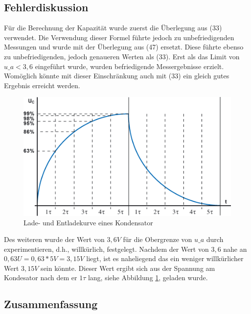 \subsection{Fehlerdiskussion}
\label{subsec:a4-fehlerdiskussion}

Für die Berechnung der Kapazität wurde zuerst die Überlegung aus (33) verwendet.
Die Verwendung dieser Formel führte jedoch zu unbefriedigenden Messungen und wurde mit der Überlegung aus (47) ersetzt.
Diese führte ebenso zu unbefriedigenden, jedoch genaueren Werten als (33).
Erst als das Limit von $u\_a < 3,6$ eingeführt wurde, wurden befriedigende Messergebnisse erzielt.
Womöglich könnte mit dieser Einschränkung auch mit (33) ein gleich gutes Ergebnis erreicht werden.

\begin{figure}[ht]
    \centering
    \includegraphics[width=\textwidth]{pictures/Kondensator-Ladekurve.png}
    \caption{Lade- und Entladekurve eines Kondensator \cite{kondesator}}
    \label{fig:lade-entladekurve-kondensator}
\end{figure}

Des weiteren wurde der Wert von $3,6V$ für die Obergrenze von $u\_a$ durch experimentieren, d.h., willkürlich, festgelegt.
Nachdem der Wert von $3,6$ nahe an $0,63U = 0,63*5V = 3,15V$ liegt, ist es naheliegend das ein weniger willkürlicher Wert $3,15V$ sein könnte.
Dieser Wert ergibt sich aus der Spannung am Kondesator nach dem er $1\tau$ lang, siehe Abbildung \ref{fig:lade-entladekurve-kondensator}, geladen wurde.

\subsection{Zusammenfassung}
\label{subsec:a4-zusammenfassung2}
